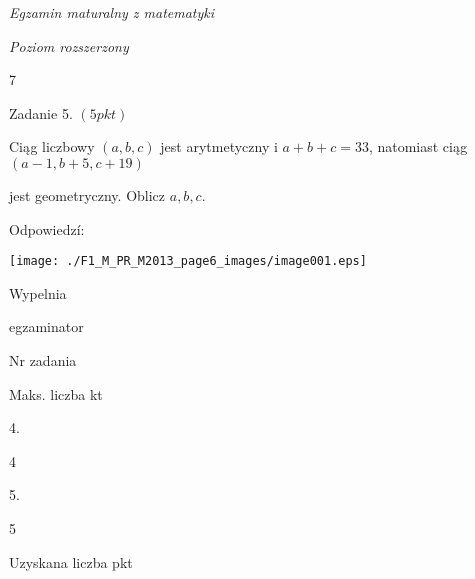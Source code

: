 \documentclass[a4paper,12pt]{article}
\begin{document}
{\it Egzamin maturalny z matematyki}

{\it Poziom rozszerzony}

7

Zadanie 5. $(5pkt)$

Ciąg liczbowy $(a,b,c)$ jest arytmetyczny i $a+b+c=33$, natomiast ciąg $(a-1,b+5,c+19)$

jest geometryczny. Oblicz $a, b, c.$

Odpowiedzí:
\begin{center}
\texttt{[image: ./F1\_M\_PR\_M2013\_page6\_images/image001.eps]}
\end{center}
Wypelnia

egzaminator

Nr zadania

Maks. liczba kt

4.

4

5.

5

Uzyskana liczba pkt
\end{document}
